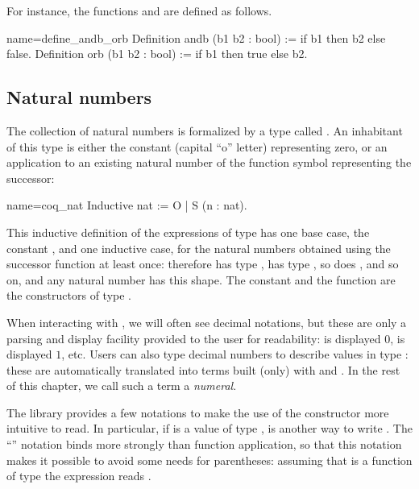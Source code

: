 For instance, the functions  and  are defined as follows.

\begin{coq}{name=define_andb_orb}{}
Definition andb (b1 b2 : bool) := if b1 then b2   else false.
Definition orb  (b1 b2 : bool) := if b1 then true else b2.
\end{coq}


\subsection{Natural numbers}
\label{ssec:nat}

The collection of natural numbers is formalized by a type called
. An inhabitant of this type is either the constant 
(capital ``o'' letter) representing zero, or an
application to an existing natural number of the function symbol 
representing the successor:

\begin{coq}{name=coq_nat}{}
Inductive nat := O | S (n : nat).
\end{coq}

This inductive definition of the expressions of type  has one
base case, the constant , and one inductive case, for the natural
numbers obtained using the successor function at least once: therefore
 has type ,  has type , so does
, and
so on, and any natural number has this shape. The constant  and
the function  are the constructors of type .

When interacting with
\Coq{}, we will often see decimal
notations, but these are only a parsing and display
facility provided to the user for readability:  is displayed
$0$,  is displayed $1$, etc.  Users can also type decimal
numbers to describe values in type : these are automatically
translated into terms built (only) with  and . In the rest
of this chapter, we call such a term a \emph{numeral}.

The \mcbMC{} library provides a few notations to make the use of the
constructor  more intuitive to read.  In particular, if 
is a value of type ,  is another way to write
.  The ``'' notation binds more strongly than function
application, so that this notation makes it possible to avoid some
needs for parentheses: assuming  that  is a function of type
 the expression  reads
.

